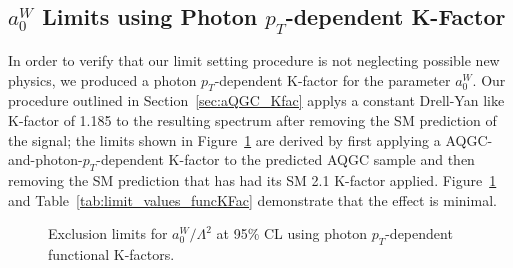 \subsection{$a_{0}^{W}$ Limits using Photon $p_{T}$-dependent K-Factor}
\label{sec:limits_pTKFact}
In order to verify that our limit setting procedure is not neglecting
possible new physics, we produced a photon $p_{T}$-dependent K-factor
for the parameter $a_{0}^{W}$. Our procedure outlined in 
Section~\ref{sec:aQGC_Kfac} applys a constant Drell-Yan like K-factor
of 1.185 to the resulting spectrum after removing the SM prediction 
of the signal; the limits shown in Figure~\ref{fig:limits_functKfac} are derived
by first applying a AQGC-and-photon-$p_{T}$-dependent K-factor
to the predicted AQGC sample and then removing the SM prediction that
has had its SM 2.1 K-factor applied. 
Figure~\ref{fig:limits_functKfac} and Table~\ref{tab:limit_values_funcKFac}
demonstrate that the effect is minimal.

\begin{table}[htb]
\centering
{}
  \caption{95\% CL shape-based exclusion limits listed for both the muon and electron channels of the AQGC parameter $a_{0}^{W}/\Lambda^{2}$, using photon $p_{T}$, without MVA optimization, and with a $p_{T}$-dependent K-factor.}
  \label{tab:limit_values_funcKFac}
\end{table}

\begin{figure}[hb]
  \begin{center}
    \caption{ Exclusion limits for $a_{0}^{W}/\Lambda^{2}$ at 95\% CL using photon $p_{T}$-dependent functional K-factors.}
    \label{fig:limits_functKfac}
  \end{center}
\end{figure}

